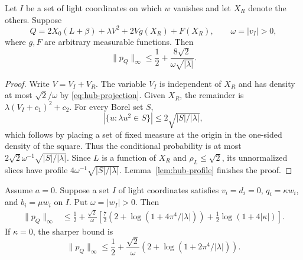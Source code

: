 \begin{proposition}
\label{prop:hub-free-square}
Let $I$ be a set of light coordinates on which $w$ vanishes and let
$X_R$ denote the others.  Suppose
\[
 Q=2X_0(L+\beta)+\lambda V^2+2Vg(X_R)+F(X_R),
 \qquad \omega=|v_I|>0,
\]
where $g,F$ are arbitrary measurable functions.  Then
\[
 \|p_Q\|_\infty\le\frac12+
             \frac{8\sqrt2}{\omega\sqrt{|\lambda|}}.
\]
\end{proposition}

\begin{proof}
Write $V=V_I+V_R$.  The variable $V_I$ is independent of $X_R$ and
has density at most $\sqrt2/\omega$ by
\eqref{eq:hub-projection}.  Given $X_R$, the remainder is
$\lambda(V_I+c_1)^2+c_2$.  For every Borel set $S$,
\[
 |\{u:\lambda u^2\in S\}|\le2\sqrt{|S|/|\lambda|},
\]
which follows by placing a set of fixed measure at the origin in the
one-sided density of the square.  Thus the conditional probability is
at most $2\sqrt2\omega^{-1}\sqrt{|S|/|\lambda|}$.
Since $L$ is a function of $X_R$ and $\rho_L\le\sqrt2$, its
unnormalized slices have profile
$4\omega^{-1}\sqrt{|S|/|\lambda|}$.
Lemma~\ref{lem:hub-profile} finishes the proof.
\end{proof}

\begin{proposition}
\label{prop:hub-free-partner}
Assume $a=0$.  Suppose a set $I$ of light coordinates satisfies
$v_i=d_i=0$, $q_i=\kappa w_i$, and $b_i=\mu w_i$ on $I$.
Put $\omega=|w_I|>0$.  Then
\begin{align*}
 \|p_Q\|_\infty
 &\le\frac12+\frac{\sqrt2}{\omega}
 \left[\frac72\left(2+\log(1+4\pi^4/|\lambda|)\right)
                          +\frac12\log(1+4|\kappa|)\right].
\end{align*}
If $\kappa=0$, the sharper bound is
\[
 \|p_Q\|_\infty\le\frac12+\frac{\sqrt2}{\omega}
                        \left(2+\log(1+2\pi^4/|\lambda|)\right).
\]
\end{proposition}

